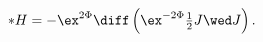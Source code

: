 \begin{equation}
\label{2SU4H}
   *H = -\ex^{2\Phi}\diff \left(\ex^{-2\Phi}\tfrac{1}{2}J \wed J \right) . 
\end{equation}

